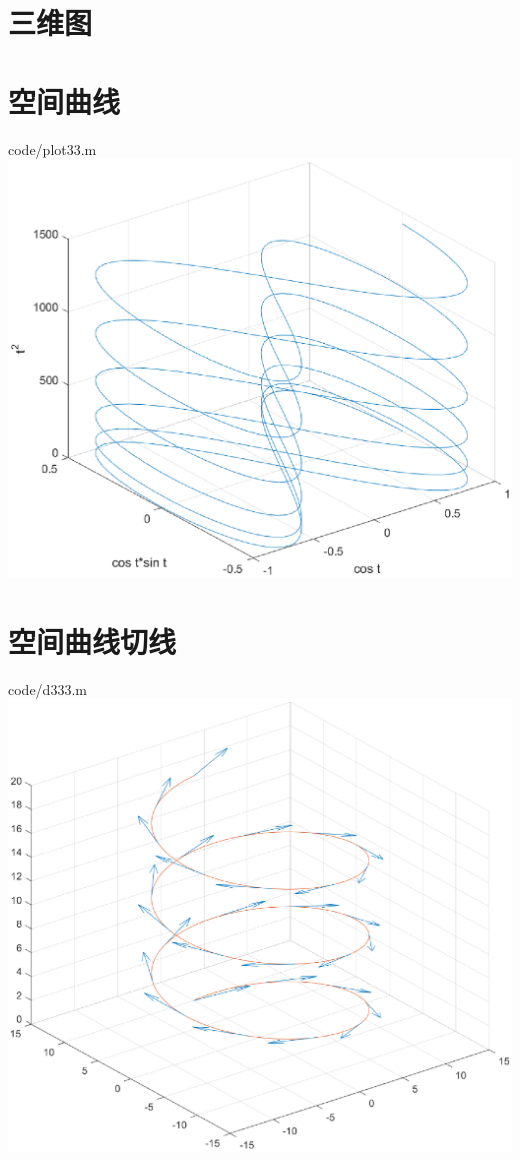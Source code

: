 \documentclass{hfutpaper}
\makeatletter
\newcommand{\figcaption}{\def\@captype{figure}\caption}
\makeatother
\begin{document}
\section{三维图}
\section*{空间曲线}

{code/plot33.m}
\includegraphics[width=18cm]{figure/plot33.eps}
\figcaption{空间曲线}
\section*{空间曲线切线}

{code/d333.m}
\includegraphics[width=18cm]{figure/d333.eps}
\figcaption{空间曲线切线}
\end{document}
